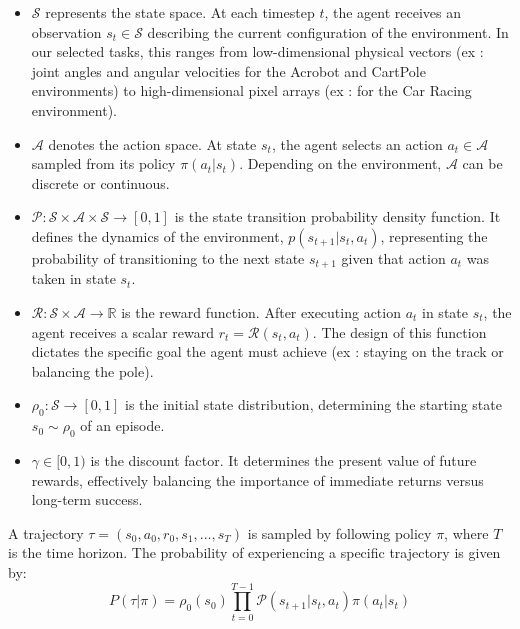 \documentclass{article}
\begin{document}
\begin{itemize}
  \item $\mathcal{S}$ represents the state space. At each timestep $t$, the agent receives an observation $s_t \in \mathcal{S}$ describing the current configuration of the environment. In our selected tasks, this ranges from low-dimensional physical vectors (ex : joint angles and angular velocities for the Acrobot and CartPole environments) to high-dimensional pixel arrays (ex : for the Car Racing environment).

  \item $\mathcal{A}$ denotes the action space. At state $s_t$, the agent selects an action $a_t \in \mathcal{A}$ sampled from its policy $\pi(a_t | s_t)$. Depending on the environment, $\mathcal{A}$ can be discrete or continuous.

  \item $\mathcal{P}: \mathcal{S} \times \mathcal{A} \times \mathcal{S} \rightarrow [0, 1]$ is the state transition probability density function. It defines the dynamics of the environment, $p(s_{t+1} | s_t, a_t)$, representing the probability of transitioning to the next state $s_{t+1}$ given that action $a_t$ was taken in state $s_t$.

  \item $\mathcal{R}: \mathcal{S} \times \mathcal{A} \rightarrow \mathbb{R}$ is the reward function. After executing action $a_t$ in state $s_t$, the agent receives a scalar reward $r_t = \mathcal{R}(s_t, a_t)$. The design of this function dictates the specific goal the agent must achieve (ex : staying on the track or balancing the pole).

  \item $\rho_0: \mathcal{S} \rightarrow [0, 1]$ is the initial state distribution, determining the starting state $s_0 \sim \rho_0$ of an episode.

  \item $\gamma \in [0, 1)$ is the discount factor. It determines the present value of future rewards, effectively balancing the importance of immediate returns versus long-term success.
\end{itemize}

A trajectory $\tau = (s_0, a_0, r_0, s_1, \dots, s_T)$ is sampled by following policy $\pi$, where $T$ is the time horizon. The probability of experiencing a specific trajectory is given by:
\begin{equation}
  P(\tau | \pi) = \rho_0(s_0) \prod_{t=0}^{T-1} \mathcal{P}(s_{t+1} | s_t, a_t) \pi(a_t | s_t)
\end{equation}
\end{document}
